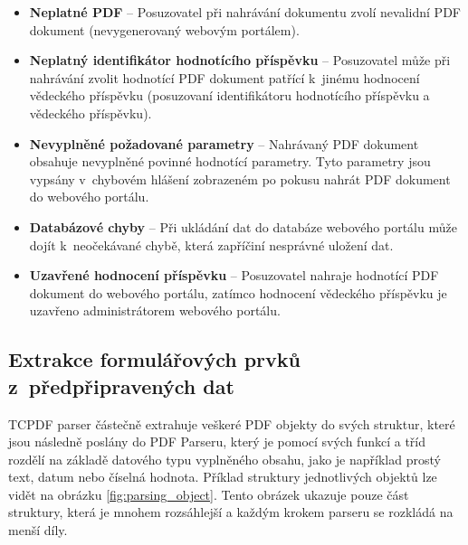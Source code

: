 \begin{itemize}
	\item \textbf{Neplatné PDF} -- Posuzovatel při nahrávání dokumentu zvolí nevalidní PDF dokument (nevygenerovaný webovým portálem).
	\item \textbf{Neplatný identifikátor hodnotícího příspěvku} -- Posuzovatel může při nahrávání zvolit hodnotící PDF dokument patřící k~jinému hodnocení vědeckého příspěvku (posuzovaní identifikátoru hodnotícího příspěvku a vědeckého příspěvku).
	\item \textbf{Nevyplněné požadované parametry} -- Nahrávaný PDF dokument obsahuje nevyplněné povinné hodnotící parametry. Tyto parametry jsou vypsány v~chybovém hlášení zobrazeném po pokusu nahrát PDF dokument do webového portálu.
	\item \textbf{Databázové chyby} -- Při ukládání dat do databáze webového portálu může dojít k~neočekávané chybě, která zapříčiní nesprávné uložení dat. 
	\item \textbf{Uzavřené hodnocení příspěvku} -- Posuzovatel nahraje hodnotící PDF dokument do webového portálu, zatímco hodnocení vědeckého příspěvku je uzavřeno administrátorem webového portálu.
\end{itemize}

\subsection{Extrakce formulářových prvků z~předpřipravených dat}
TCPDF parser částečně extrahuje veškeré PDF objekty do svých struktur, které jsou následně poslány do PDF Parseru, který je pomocí svých funkcí a tříd rozdělí na základě datového typu vyplněného obsahu, jako je například prostý text, datum nebo číselná hodnota. Příklad struktury jednotlivých objektů lze vidět na obrázku \ref{fig:parsing_object}. Tento obrázek ukazuje pouze část struktury, která je mnohem rozsáhlejší a každým krokem parseru se rozkládá na menší díly.


